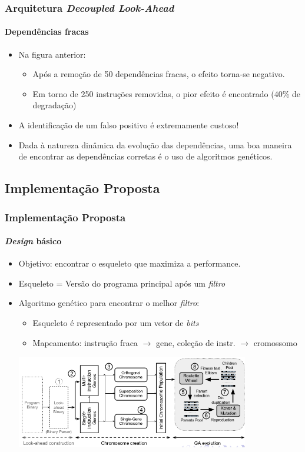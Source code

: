 \documentclass[10pt]{beamer}
\begin{document}
\begin{frame}
\frametitle{Arquitetura \textit{Decoupled Look-Ahead}}
\framesubtitle{Dependências fracas}

\begin{itemize}
 \item Na figura anterior:
 \begin{itemize}
   \item Após a remoção de 50 dependências fracas, o efeito torna-se negativo.
   \item Em torno de 250 instruções removidas, o pior efeito é encontrado (40\%
   de degradação)
 \end{itemize}
 
 \vspace{12pt}
 
 \item A identificação de um falso positivo é extremamente custoso! 
 
 \vspace{12pt}
 
 \item Dada à natureza dinâmica da evolução das dependências, uma boa maneira
 de encontrar as dependências corretas é o uso de algoritmos genéticos.
\end{itemize}
\end{frame}

\subsection {Implementação Proposta}

\begin{frame}
\frametitle{Implementação Proposta}
\framesubtitle{\textit{Design} básico}

\begin{itemize}
 \item Objetivo: encontrar o esqueleto que maximiza a performance.
 \item Esqueleto = Versão do programa principal após um \textit{filtro}
 \item Algoritmo genético para encontrar o melhor \textit{filtro}:
 \begin{itemize}
   \item Esqueleto é representado por um vetor de \textit{bits}
   \item Mapeamento: instrução fraca \(\rightarrow\) gene, coleção de instr.
   \(\rightarrow\) cromossomo
 \end{itemize}
 
 \vspace{12pt}
 \centering
\includegraphics[width=0.8\textwidth]{images/evol}
\end{itemize}
\end{frame}
\end{document}
